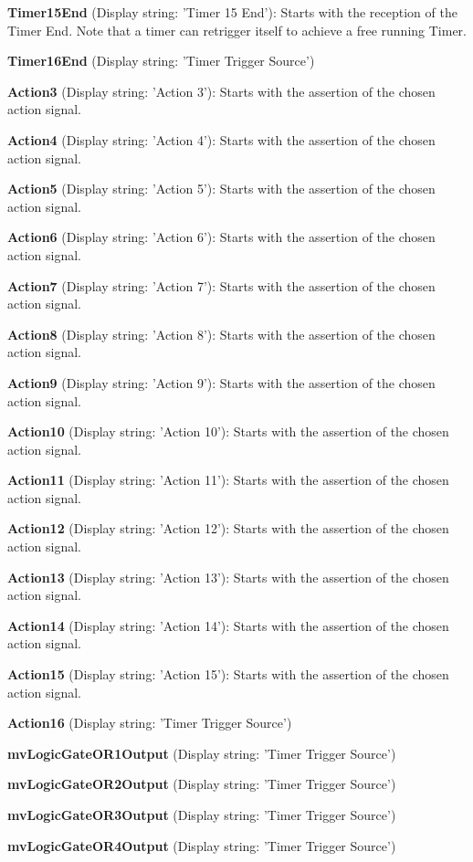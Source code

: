 \begin{DoxyItemize}
\item {\bfseries Timer15\+End} (Display string\+: 'Timer 15 End')\+: Starts with the reception of the Timer End. Note that a timer can retrigger itself to achieve a free running Timer.
\item {\bfseries Timer16\+End} (Display string\+: 'Timer Trigger Source')
\item {\bfseries Action3} (Display string\+: 'Action 3')\+: Starts with the assertion of the chosen action signal.
\item {\bfseries Action4} (Display string\+: 'Action 4')\+: Starts with the assertion of the chosen action signal.
\item {\bfseries Action5} (Display string\+: 'Action 5')\+: Starts with the assertion of the chosen action signal.
\item {\bfseries Action6} (Display string\+: 'Action 6')\+: Starts with the assertion of the chosen action signal.
\item {\bfseries Action7} (Display string\+: 'Action 7')\+: Starts with the assertion of the chosen action signal.
\item {\bfseries Action8} (Display string\+: 'Action 8')\+: Starts with the assertion of the chosen action signal.
\item {\bfseries Action9} (Display string\+: 'Action 9')\+: Starts with the assertion of the chosen action signal.
\item {\bfseries Action10} (Display string\+: 'Action 10')\+: Starts with the assertion of the chosen action signal.
\item {\bfseries Action11} (Display string\+: 'Action 11')\+: Starts with the assertion of the chosen action signal.
\item {\bfseries Action12} (Display string\+: 'Action 12')\+: Starts with the assertion of the chosen action signal.
\item {\bfseries Action13} (Display string\+: 'Action 13')\+: Starts with the assertion of the chosen action signal.
\item {\bfseries Action14} (Display string\+: 'Action 14')\+: Starts with the assertion of the chosen action signal.
\item {\bfseries Action15} (Display string\+: 'Action 15')\+: Starts with the assertion of the chosen action signal.
\item {\bfseries Action16} (Display string\+: 'Timer Trigger Source')
\item {\bfseries mv\+Logic\+Gate\+O\+R1\+Output} (Display string\+: 'Timer Trigger Source')
\item {\bfseries mv\+Logic\+Gate\+O\+R2\+Output} (Display string\+: 'Timer Trigger Source')
\item {\bfseries mv\+Logic\+Gate\+O\+R3\+Output} (Display string\+: 'Timer Trigger Source')
\item {\bfseries mv\+Logic\+Gate\+O\+R4\+Output} (Display string\+: 'Timer Trigger Source')
\end{DoxyItemize}

